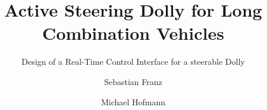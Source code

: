 \documentclass[masters,a4paper]{chalmers-thesis}
\title{Active Steering Dolly for Long Combination Vehicles}
\subtitle{Design of a Real-Time Control Interface for a steerable Dolly} %
\author{Sebastian Franz\and Michael Hofmann}
\begin{document}
\maketitle









\nocite{*} %
\printbibliography %
%
%
%
\end{document}

